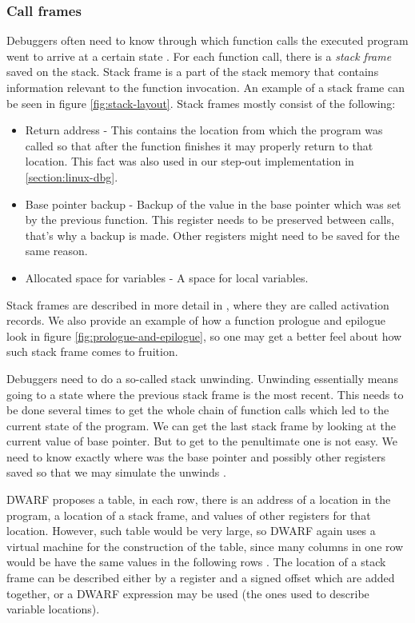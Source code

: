 \subsubsection{Call frames}
Debuggers often need to know through which function calls the executed program
went to arrive at a certain state \cite{dwarf}. For each function call, there
is a \textit{stack frame} saved on the stack. Stack frame is a part of the stack memory that
contains information relevant to the function invocation. An example of a
stack frame can be seen in figure \ref{fig:stack-layout}.
Stack frames mostly consist of the following:
\begin{itemize}
    \item Return address - This contains the location from which the program
        was called so that after the function finishes it may properly return
        to that location. This fact was also used in our step-out
        implementation in \ref{section:linux-dbg}.
    \item Base pointer backup - Backup of the value in the base pointer which
        was set by the previous function. This register needs to be preserved
        between calls, that's why a backup is made. Other registers might need
        to be saved for the same reason.
    \item Allocated space for variables - A space for local variables.
\end{itemize}
Stack frames are described in more detail in \cite{dragon-book}, where they are
called activation records. We also provide an example of how a function
prologue and epilogue look in figure \ref{fig:prologue-and-epilogue}, so one
may get a better feel about how such stack frame comes to fruition.

Debuggers need to do a so-called stack unwinding. Unwinding essentially means
going to a state where the previous stack frame is the most recent. This needs
to be done several times to get the whole chain of function calls which led to
the current state of the program. We can get the last stack frame by looking at
the current value of base pointer. But to get to the penultimate one is not
easy. We need to know exactly where was the base pointer and possibly other
registers saved so that we may simulate the unwinds \cite{dwarf}.

DWARF proposes a table, in each row, there is an address of a location in the
program, a location of a stack frame, and values of other registers for that
location. However, such table would be very large, so DWARF again uses a
virtual machine for the construction of the table, since many columns in one
row would be have the same values in the following rows \cite{dwarf}. The
location of a stack frame can be described either by a register and a signed
offset which are added together, or a DWARF expression may be used (the ones
used to describe variable locations).

